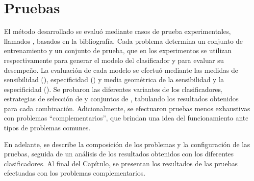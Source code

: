 %
%
%
%
\setcounter{chapter}{3}
%
\chapter{Pruebas}
%
El método desarrollado se evaluó mediante casos de prueba
experimentales, llamados , basados en la bibliografía.
Cada problema determina un conjunto de entrenamiento y un conjunto de
prueba, que en los experimentos se utilizan respectivamente para
generar el modelo del clasificador y para evaluar su desempeño.
La evaluación de cada modelo se efectuó mediante las medidas de
sensibilidad (\SE), especificidad (\SP) y media geométrica de la
sensibilidad y la especificidad (\GM).
Se probaron las diferentes variantes de los clasificadores,
estrategias de selección de  y conjuntos de ,
tabulando los resultados obtenidos para cada combinación.
Adicionalmente, se efectuaron pruebas menos exhaustivas con problemas
``complementarios'', que brindan una idea del funcionamiento ante
tipos de problemas comunes.

En adelante, se describe la composición de los problemas y la
configuración de las pruebas, seguida de un análisis de los resultados
obtenidos con los diferentes clasificadores.
Al final del Capítulo, se presentan los resultados de las pruebas
efectuadas con los problemas complementarios.
